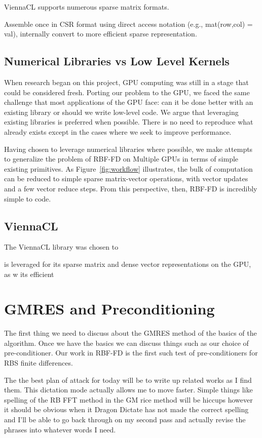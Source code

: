 \documentclass{report}
\begin{document}
ViennaCL supports numerous sparse matrix formats. 

Assemble once in CSR format using direct access notation (e.g., mat(row,col) = val), internally convert to more efficient sparse representation. 



\section{Numerical Libraries vs Low Level Kernels}

When research began on this project, GPU computing was still in a stage that could be considered fresh. Porting our problem to the GPU, we faced the same challenge that most applications of the GPU face: can it be done better with an existing library or should we write low-level code. We argue that leveraging existing libraries is preferred when possible. There is no need to reproduce what already exists except in the cases where we seek to improve performance. 

Having chosen to leverage numerical libraries where possible, we make attempts to generalize the problem of RBF-FD on Multiple GPUs in terms of simple existing primitives. As Figure~\ref{fig:workflow} illustrates, the bulk of computation can be reduced to simple sparse matrix-vector operations, with vector updates and a few vector reduce steps. From this perspective, then, RBF-FD is incredibly simple to code. 

\section{ViennaCL}

The ViennaCL library was chosen to 

is leveraged for its sparse matrix and dense vector representations on the GPU, as w its efficient 




\chapter{GMRES and Preconditioning}
The first thing we need to discuss about the GMRES method of the basics of the algorithm. Once we have the basics we can discuss things such as our choice of pre-conditioner. Our work in RBF-FD is the first such test of pre-conditioners for RBS finite differences.

The the best plan of attack for today will be to write up related works as I find them. This dictation mode actually allows me to move faster. Simple things like spelling of the RB FFT method in the GM rice method will be hiccups however it should be obvious when it Dragon Dictate has not made the correct spelling and I'll be able to go back through on my second pass and actually revise the phrases into whatever words I need.
\end{document}
